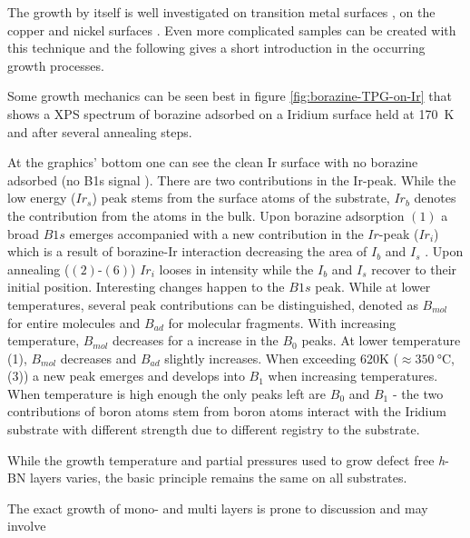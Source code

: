 The growth by itself is well investigated on transition metal surfaces \cite{gomez_diaz_hexagonal_2013,morscher_formation_2006}, on the copper and nickel surfaces \cite{preobrajenski_monolayer_2005,joshi_boron_2012}. Even more complicated samples can be created with this technique \cite{roth_chemical_2013} and the following gives a short introduction in the occurring growth processes.

Some growth mechanics can be seen best in figure \ref{fig:borazine-TPG-on-Ir} that shows a XPS spectrum of borazine adsorbed on a Iridium surface held at \SI{170}{\kelvin} and after several annealing steps. 

At the graphics' bottom one can see the clean Ir surface with no borazine adsorbed (no B1s signal ). There are two contributions in the Ir-peak. While the low energy ($Ir_s$) peak stems from the surface atoms of the substrate, $Ir_b$ denotes the contribution from the atoms in the bulk. Upon borazine adsorption $(1)$ a broad $B1s$ emerges accompanied with a new contribution in the $Ir$-peak ($Ir_i$) which is a result of borazine-Ir interaction decreasing the area of $I_b$ and $I_s$ .
Upon annealing ($(2)$-$(6)$) $Ir_i$ looses in intensity while the $I_b$ and $I_s$ recover to their initial position. Interesting changes happen to the $B1s$ peak. While at lower temperatures, several peak contributions can be distinguished, denoted as $B_{mol}$ for entire molecules and $B_{ad}$ for molecular fragments. With increasing temperature, $B_{mol}$ decreases for a increase in the $B_0$ peaks. At lower temperature (1), $B_{mol}$ decreases and $B_{ad}$ slightly increases. When exceeding 620K ($\approx \SI{350}{\celsius}$, (3)) a new peak emerges and develops into $B_1$ when increasing temperatures. When temperature is high enough the only peaks left are $B_0$ and $B_1$ - the two contributions of boron atoms stem from boron atoms interact with the Iridium substrate with different strength due to different registry to the substrate.

While the growth temperature and partial pressures used to grow defect free \textit{h}-BN layers varies, the basic principle remains the same on all substrates.

The exact growth of mono- and multi layers \cite{ismach_toward_2012} is prone to discussion and may involve  
